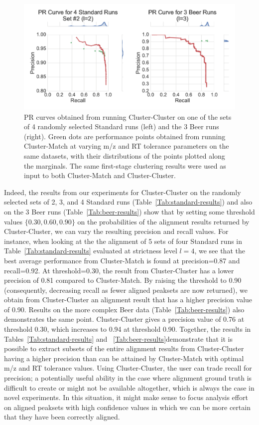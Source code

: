 \begin{figure}[!htbp]
\centering
\includegraphics[width=1.0\linewidth]{05-precursor-cluster/figures/fig4.pdf}
\caption{\label{fig:pr-curve} PR curves obtained from running Cluster-Cluster on one of the sets of 4 randomly selected Standard runs (left) and the 3 Beer runs (right). Green dots are performance points obtained from running Cluster-Match at varying m/z and RT tolerance parameters on the same datasets, with their distributions of the points plotted along the marginals. The same first-stage clustering results were used as input to both Cluster-Match and Cluster-Cluster.}
\end{figure}

Indeed, the results from our experiments for Cluster-Cluster on the randomly selected sets of 2, 3, and 4 Standard runs (Table~\ref{Tab:standard-results}) and also on the 3 Beer runs (Table~\ref{Tab:beer-results}) show that by setting some threshold values $\{0.30, 0.60, 0.90\}$ on the probabilities of the alignment results returned by Cluster-Cluster, we can vary the resulting precision and recall values. For instance, when looking at the the alignment of 5 sets of four Standard runs in Table~\ref{Tab:standard-results} evaluated at strictness level $l=4$, we see that the best average performance from Cluster-Match is found at precision=0.87 and recall=0.92. At threshold=0.30, the result from Cluster-Cluster has a lower precision of 0.81 compared to Cluster-Match. By raising the threshold to 0.90 (consequently, decreasing recall as fewer aligned peaksets are now returned), we obtain from Cluster-Cluster an alignment result that has a higher precision value of 0.90. Results on the more complex Beer data (Table~\ref{Tab:beer-results}) also demonstrates the same point. Cluster-Cluster gives a precision value of 0.76 at threshold 0.30, which increases to 0.94 at threshold 0.90. Together, the results in Tables~\ref{Tab:standard-results} and ~\ref{Tab:beer-results}demonstrate that it is possible to extract subsets of the entire alignment results from Cluster-Cluster having a higher precision than can be attained by Cluster-Match with optimal m/z and RT tolerance values. Using Cluster-Cluster, the user can trade recall for precision; a potentially useful ability in the case where alignment ground truth is difficult to create or might not be available altogether, which is always the case in novel experiments. In this situation, it might make sense to focus analysis effort on aligned peaksets with high confidence values in which we can be more certain that they have been correctly aligned.

